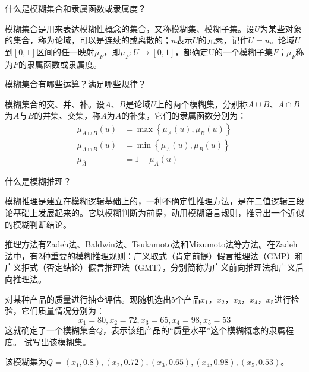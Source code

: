 \begin{question}
什么是模糊集合和隶属函数或隶属度？
\end{question}
\begin{solution}
模糊集合是用来表达模糊性概念的集合，又称模糊集、模糊子集。设$U$为某些对象的集合，称为论域，可以是连续的或离散的；$u$表示$U$的元素，记作$U={u}$。论域$U$到$[0,1]$区间的任一映射$\mu_F$，即$\mu_F \colon U\to [0,1]$，都确定U的一个模糊子集$F$；$\mu_F$称为$F$的隶属函数或隶属度。
\end{solution}

\begin{question}
模糊集合有哪些运算？满足哪些规律？
\end{question}
\begin{solution}
模糊集合的交、并、补。设$A$、$B$是论域$U$上的两个模糊集，分别称$A \cup B$、$A \cap B$为$A$与$B$的并集、交集，称$\overline{A}$为$A$的补集，它们的隶属函数分别为：
	\begin{align*}
		\mu_{A \cup B}(u) &= \max \left\{ \mu_A(u), \mu_B(u) \right\} \\
		\mu_{A \cap B}(u) &= \min \left\{ \mu_A(u), \mu_B(u) \right\} \\
		\mu_{\overline{A}} &= 1 - \mu_A(u)
	\end{align*}
\end{solution}

\begin{question}
什么是模糊推理？
\end{question}
\begin{solution}
模糊推理是建立在模糊逻辑基础上的，一种不确定性推理方法，是在二值逻辑三段论基础上发展起来的。它以模糊判断为前提，动用模糊语言规则，推导出一个近似的模糊判断结论。\par
推理方法有Zadeh法、Baldwin法、Tsukamoto法和Mizumoto法等方法。在Zadeh法中，有2种重要的模糊推理规则：广义取式（肯定前提）假言推理法（GMP）和广义拒式（否定结论）假言推理法（GMT），分别简称为广义前向推理法和广义后向推理法。  
\end{solution}

\begin{question}
对某种产品的质量进行抽查评估。现随机选出5个产品$x_1$，$x_2$，$x_3$，$x_4$，$x_5$进行检验，它们质量情况分别为：
\[ x_1=80, x_2=72, x_3=65, x_4=98, x_5=53\]
这就确定了一个模糊集合$Q$，表示该组产品的``质量水平''这个模糊概念的隶属程度。
试写出该模糊集。
\end{question}
\begin{solution}
该模糊集为$Q={(x_1,0.8), (x_2, 0.72), (x_3,0.65), (x_4,0.98), (x_5,0.53)}$。
\end{solution}

